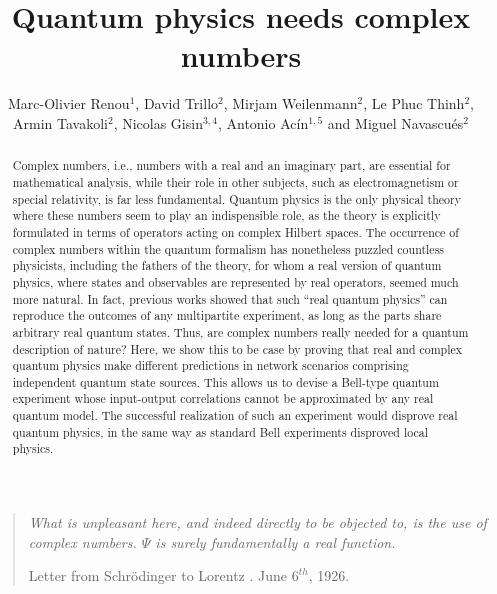 \documentclass[onecolumn,prx,amsmath,amssymb,12pt]{revtex4-2}
\begin{document}
\title{Quantum physics needs complex numbers}
\author{Marc-Olivier Renou$^1$, David Trillo$^2$, Mirjam Weilenmann$^2$, Le Phuc Thinh$^2$, Armin Tavakoli$^2$, Nicolas Gisin$^{3,4}$, Antonio Ac\'in$^{1,5}$ and Miguel Navascu\'es$^2$}



\begin{abstract}
Complex numbers, i.e., numbers with a real and an imaginary part, are essential for mathematical analysis, while their role in other subjects, such as electromagnetism or special relativity, is far less fundamental. Quantum physics is the only physical theory where these numbers seem to play an indispensible role, as the theory is explicitly formulated in terms of operators acting on complex Hilbert spaces. The occurrence of complex numbers within the quantum formalism has nonetheless puzzled countless physicists, including the fathers of the theory, for whom a real version of quantum physics, where states and observables are represented by real operators, seemed much more natural. In fact, previous works showed that such ``real quantum physics'' can reproduce the outcomes of any multipartite experiment, as long as the parts share arbitrary real quantum states. Thus, are complex numbers really needed for a quantum description of nature? Here, we show this to be case by proving that real and complex quantum physics make different predictions in network scenarios comprising independent quantum state sources. This allows us to devise a Bell-type quantum experiment whose input-output correlations cannot be approximated by any real quantum model. The successful realization of such an experiment would disprove real quantum physics, in the same way as standard Bell experiments disproved local  physics.
\end{abstract}
\maketitle
\begin{quote}
\emph{What is unpleasant here, and indeed directly to be objected to, is the use of complex numbers. $\Psi$ is surely fundamentally a real function.}

Letter from Schr\"{o}dinger to Lorentz \cite{einstein2011letters}. June $6^{th}$, 1926.    
\end{quote}
\end{document}
